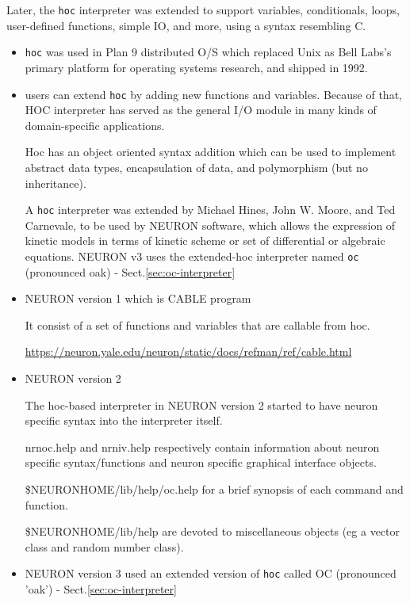 Later, the \verb!hoc! interpreter was extended to support variables,
conditionals, loops, user-defined functions, simple IO, and more, using a syntax
resembling C.
\begin{itemize}
  \item  \verb!hoc! was used in Plan 9
distributed O/S which replaced Unix as Bell Labs's primary platform for
operating systems research, and shipped in 1992. 
  
  \item users can extend \verb!hoc! by adding new functions and variables.
  Because of that, HOC interpreter has served as the general I/O module in many
  kinds of domain-specific applications.

Hoc has an object oriented syntax addition which can be used to implement
abstract data types, encapsulation of data, and polymorphism (but no
inheritance). 

A \verb!hoc! interpreter was extended by Michael Hines, John W. Moore, and Ted
Carnevale, to be used by NEURON software, which allows the expression of kinetic
models in terms of kinetic scheme or set of differential or algebraic equations.
NEURON v3 uses the extended-hoc interpreter named \verb!oc! (pronounced oak) -
Sect.\ref{sec:oc-interpreter}

\end{itemize}


\begin{itemize}
  \item NEURON version 1 which is CABLE program
  
  It consist of a set of functions and variables that are callable from hoc.
 
  \url{https://neuron.yale.edu/neuron/static/docs/refman/ref/cable.html}
  
  \item NEURON version 2 
  
 The hoc-based interpreter in NEURON version 2 started to have neuron specific
 syntax into the interpreter itself.
   
 nrnoc.help and nrniv.help respectively contain information about neuron
 specific syntax/functions and neuron specific graphical interface objects.
 
\$NEURONHOME/lib/help/oc.help for a brief synopsis of each command and function.

\$NEURONHOME/lib/help are devoted to miscellaneous objects (eg a vector class
and random number class).

  \item NEURON version 3 used an extended version of \verb!hoc! called OC
  (pronounced 'oak') - Sect.\ref{sec:oc-interpreter}
  
  
\end{itemize}

